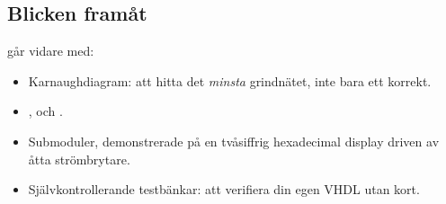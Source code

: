 \subsection*{Blicken framåt}
 går vidare med:
\begin{itemize}
  \item Karnaughdiagram: att hitta det \emph{minsta} grindnätet, inte bara ett korrekt.
  \item {},  och .
  \item Submoduler, demonstrerade på en tvåsiffrig hexadecimal display driven av åtta
    strömbrytare.
  \item Självkontrollerande testbänkar: att verifiera din egen VHDL utan kort.
\end{itemize}
